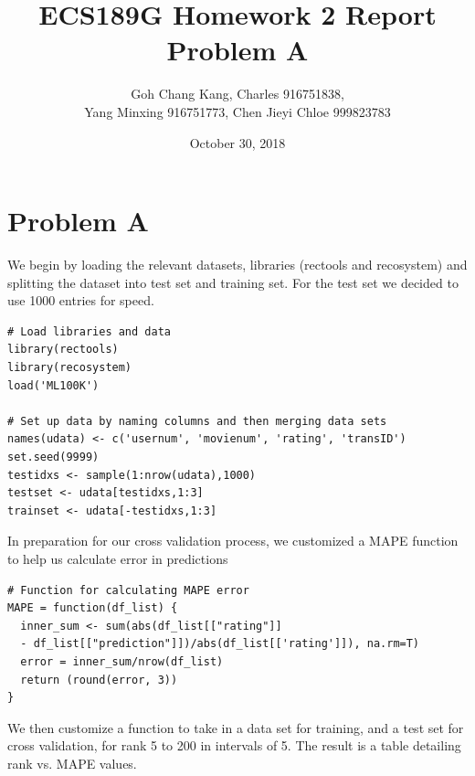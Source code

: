 \documentclass{article}
\begin{document}
\begin{titlepage}
\title{ECS189G Homework 2 Report Problem A}
\author{Goh Chang Kang, Charles 916751838, \\
Yang Minxing 916751773, Chen Jieyi Chloe 999823783}

\date{October 30, 2018}
\maketitle
\end{titlepage}


\section{Problem A}
We begin by loading the relevant datasets, libraries (rectools and recosystem) and splitting the dataset into test set and training set. For the test set we decided to use 1000 entries for speed. 
\begin{verbatim}
# Load libraries and data
library(rectools)
library(recosystem)
load('ML100K')

# Set up data by naming columns and then merging data sets
names(udata) <- c('usernum', 'movienum', 'rating', 'transID')
set.seed(9999)
testidxs <- sample(1:nrow(udata),1000)
testset <- udata[testidxs,1:3]
trainset <- udata[-testidxs,1:3]
\end{verbatim}

In preparation for our cross validation process, we customized a MAPE function to help us calculate error in predictions

\begin{verbatim}
# Function for calculating MAPE error
MAPE = function(df_list) {
  inner_sum <- sum(abs(df_list[["rating"]] 
  - df_list[["prediction"]])/abs(df_list[['rating']]), na.rm=T)
  error = inner_sum/nrow(df_list)
  return (round(error, 3))
}
\end{verbatim}

We then customize a function to take in a data set for training, and a test set for cross validation, for rank 5 to 200 in intervals of 5. The result is a table detailing rank vs. MAPE values.
\end{document}

